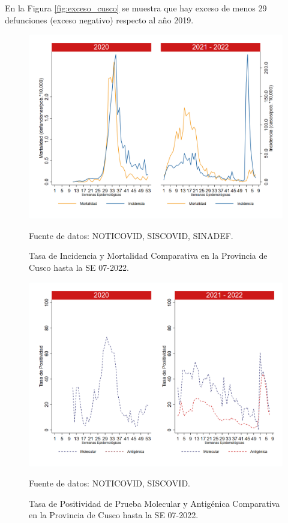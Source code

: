 \documentclass[12pt,a4paper,openany]{book}
\begin{document}
	En la Figura \ref{fig:exceso_cusco} se muestra que hay exceso de menos 29 defunciones (exceso negativo) respecto al año 2019.
		
		\begin{figure}[h]
			\caption{Tasa de Incidencia y Mortalidad Comparativa en la Provincia de Cusco hasta la SE 07-2022.}\label{fig:inc_mort_cusco}
			\begin{center}
				\includegraphics[width=0.7\linewidth]{../figuras/incidencia_mortalidad_20_21_7.png}
			\end{center}
			{\footnotesize {Fuente de datos: NOTICOVID, SISCOVID, SINADEF.}}
		\end{figure}
		
		\begin{figure}[h]
			\caption{Tasa de Positividad de Prueba Molecular y Antigénica Comparativa en la Provincia de Cusco hasta la SE 07-2022.}\label{fig:positividad_cusco}
			\begin{center}
				\includegraphics[width=0.7\linewidth]{../figuras/positividad_20_21_7.png}
			\end{center}
			{\footnotesize {Fuente de datos: NOTICOVID, SISCOVID.}}
		\end{figure}
		
\end{document}
